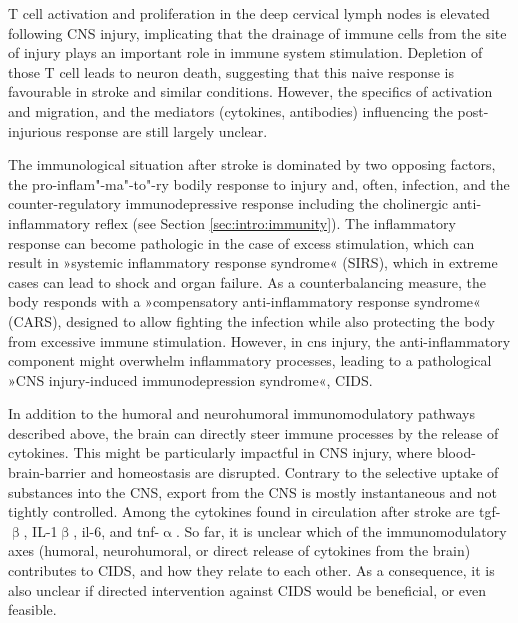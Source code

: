 T cell activation and proliferation in the deep cervical lymph nodes is elevated following CNS injury, implicating that the drainage of immune cells from the site of injury plays an important role in immune system stimulation.\cite{Walsh2015} Depletion of those T cell leads to neuron death, suggesting that this naive response is favourable in stroke and similar conditions. However, the specifics of activation and migration, and the mediators (cytokines, antibodies) influencing the post-injurious response are still largely unclear.\cite{Louveau2015}

The immunological situation after stroke is dominated by two opposing factors, the pro-inflam"-ma"-to"-ry bodily response to injury and, often, infection, and the counter-regulatory immunodepressive response including the cholinergic anti-inflammatory reflex (see Section \ref{sec:intro:immunity}). The inflammatory response can become pathologic in the case of excess stimulation, which can result in »systemic inflammatory response syndrome« (SIRS), which in extreme cases can lead to shock and organ failure. As a counterbalancing measure, the body responds with a »compensatory anti-inflammatory response syndrome« (CARS), designed to allow fighting the infection while also protecting the body from excessive immune stimulation. However, in \ac{cns} injury, the anti-inflammatory component might overwhelm inflammatory processes, leading to a pathological »CNS injury-induced immunodepression syndrome«, CIDS.

In addition to the humoral and neurohumoral immunomodulatory pathways described above, the brain can directly steer immune processes by the release of cytokines. This might be particularly impactful in CNS injury, where blood-brain-barrier and homeostasis are disrupted. Contrary to the selective uptake of substances into the CNS, export from the CNS is mostly instantaneous and not tightly controlled. Among the cytokines found in circulation after stroke are \ac{tgf}-$\upbeta$, IL-1$\upbeta$, \ac{il}-6, and \ac{tnf}-$\upalpha$. So far, it is unclear which of the immunomodulatory axes (humoral, neurohumoral, or direct release of cytokines from the brain) contributes to CIDS, and how they relate to each other. As a consequence, it is also unclear if directed intervention against CIDS would be beneficial, or even feasible.\cite{Meisel2005}

